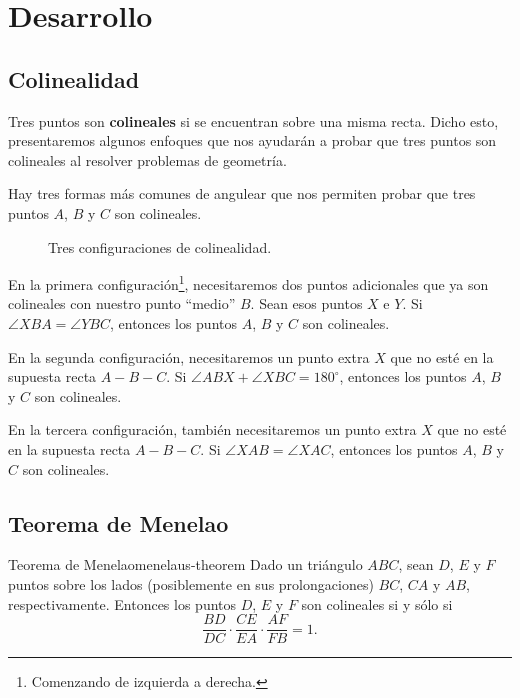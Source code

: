 \section{Desarrollo}




\subsection{Colinealidad}

\begin{figure}[H]
    \centering
    
\end{figure}

Tres puntos son \textbf{colineales} si se encuentran sobre una misma recta.
Dicho esto, presentaremos algunos enfoques que nos ayudarán a probar que tres puntos son colineales al resolver problemas de geometría.

Hay tres formas más comunes de angulear que nos permiten probar que tres puntos $A$, $B$ y $C$ son colineales.

\begin{figure}[H]
    \centering
    
    \caption{Tres configuraciones de colinealidad.}
\end{figure}

En la primera configuración\footnote{Comenzando de izquierda a derecha.}, necesitaremos dos puntos adicionales que ya son colineales con nuestro punto ``medio'' $B$.
Sean esos puntos $X$ e $Y$.
Si $\angle XBA = \angle YBC$, entonces los puntos $A$, $B$ y $C$ son colineales.

En la segunda configuración, necesitaremos un punto extra $X$ que no esté en la supuesta recta $A - B - C$.
Si $\angle ABX + \angle XBC = 180^\circ$, entonces los puntos $A$, $B$ y $C$ son colineales.

En la tercera configuración, también necesitaremos un punto extra $X$ que no esté en la supuesta recta $A - B - C$.
Si $\angle XAB = \angle XAC$, entonces los puntos $A$, $B$ y $C$ son colineales.




\subsection{Teorema de Menelao}

\begin{section-theorem.tcb}{Teorema de Menelao}{menelaus-theorem}
    Dado un triángulo $ABC$, sean $D$, $E$ y $F$ puntos sobre los lados (posiblemente en sus prolongaciones) $BC$, $CA$ y $AB$, respectivamente.
    Entonces los puntos $D$, $E$ y $F$ son colineales si y sólo si
    \[
        \frac{BD}{DC} \cdot \frac{CE}{EA} \cdot \frac{AF}{FB} = 1.
    \]
\end{section-theorem.tcb}

